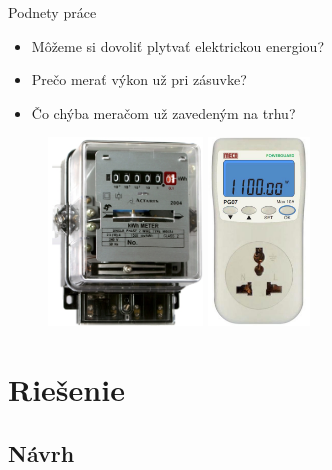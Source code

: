 \documentclass[hyperref={unicode}]{beamer}
\begin{document}
\begin{frame}{Podnety práce}
	\begin{itemize}
		\item Môžeme si dovoliť plytvať elektrickou energiou?
		\item Prečo merať výkon už pri zásuvke?
		\item Čo chýba meračom už zavedeným na trhu?
	\end{itemize}


	\begin{figure}[htp]
		\centering
		\includegraphics[height=5cm]{analog-power-meter}\hspace{1cm}
		\includegraphics[height=5cm]{digital-plug-meter}
	\end{figure}

\end{frame}



\section{Riešenie}
\label{sec:Riešenie}

\subsection{Návrh}
\label{sub:Návrh}
\end{document}
